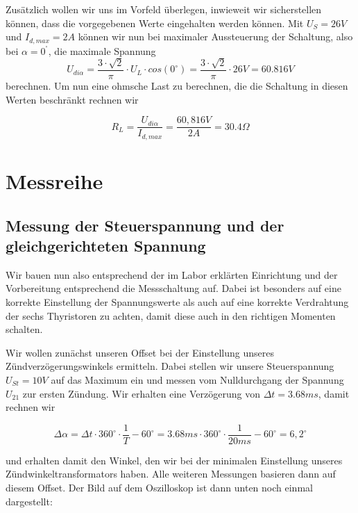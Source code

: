 \documentclass{article}
\begin{document}
Zusätzlich wollen wir uns im Vorfeld überlegen, inwieweit wir sicherstellen können, dass die vorgegebenen Werte eingehalten werden können. Mit $U_{S} = 26V$ und $I_{d,max} = 2A$ können wir nun bei maximaler Aussteuerung der Schaltung, also bei $\alpha = 0^{^{\circ}}$, die maximale Spannung $$U_{di\alpha} = \frac{3\cdot \sqrt{2}}{\pi}\cdot U_{L} \cdot cos(0^{\circ}) = \frac{3\cdot \sqrt{2}}{\pi}\cdot 26V = 60.816V$$
berechnen. Um nun eine ohmsche Last zu berechnen, die die Schaltung in diesen Werten beschränkt rechnen wir

\begin{equation*}
  \label{eq:1}
  R_{L} = \frac{U_{di\alpha}}{I_{d,max}} = \frac{60,816V}{2A} = 30.4 \Omega
\end{equation*}

\section{Messreihe}

\subsection{Messung der Steuerspannung und der gleichgerichteten Spannung}

Wir bauen nun also entsprechend der im Labor erklärten Einrichtung und der Vorbereitung entsprechend die Messschaltung auf. Dabei ist besonders auf eine korrekte Einstellung der Spannungswerte als auch auf eine korrekte Verdrahtung der sechs Thyristoren zu achten, damit diese auch in den richtigen Momenten schalten.

\noindent
Wir wollen zunächst unseren Offset bei der Einstellung unseres Zündverzögerungswinkels ermitteln. Dabei stellen wir unsere Steuerspannung $U_{St} = 10V$ auf das Maximum ein und messen vom Nulldurchgang der Spannung $U_{21}$ zur ersten Zündung. Wir erhalten eine Verzögerung von $\Delta t = 3.68ms$, damit rechnen wir

\begin{equation*}
  \label{eq:2}
  \Delta\alpha = \Delta t \cdot 360^{\circ} \cdot \frac{1}{T} - 60^{\circ} = 3.68ms \cdot 360^{\circ} \cdot \frac{1}{20ms} - 60^{\circ} = 6,2^{\circ}
\end{equation*}

und erhalten damit den Winkel, den wir bei der minimalen Einstellung unseres Zündwinkeltransformators haben. Alle weiteren Messungen basieren dann auf diesem Offset. Der Bild auf dem Oszilloskop ist dann unten noch einmal dargestellt:
\end{document}
